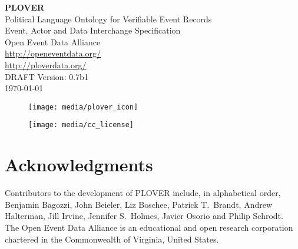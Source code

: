 \documentclass[11pt]{report}
\begin{document}

\vspace{-10pt}	

      \begin{center}
            {\Huge \bfseries PLOVER\ }\\[2ex] 
            {\LARGE Political Language Ontology for Verifiable Event Records\\ [2ex]Event, Actor and Data Interchange Specification}\\[10ex] 
            {\LARGE Open Event Data Alliance} \\[2ex] 
            {\Large \url{http://openeventdata.org/} }\\[2ex] 
            {\Large \url{http://ploverdata.org/} }\\[6ex]            
            {\LARGE DRAFT Version: 0.7b1\\ [2EX]\monthyeardate\today}
        \end{center}


\begin{figure}[h!]
\centering
\texttt{[image: media/plover\_icon]}
\end{figure}

\vspace{20pt}	


\begin{figure}[h!]
\centering
\texttt{[image: media/cc\_license]}
\end{figure}






\chapter*{Acknowledgments}

\noindent Contributors to the development of PLOVER include, in alphabetical order, Benjamin Bagozzi, John Beieler, Liz Boschee, Patrick T.~Brandt, Andrew Halterman, Jill Irvine, Jennifer S.~Holmes, Javier Osorio and Philip Schrodt.\\

\noindent The Open Event Data Alliance is an educational and open research corporation chartered in the Commonwealth of Virginia, United States.\\
\end{document}

